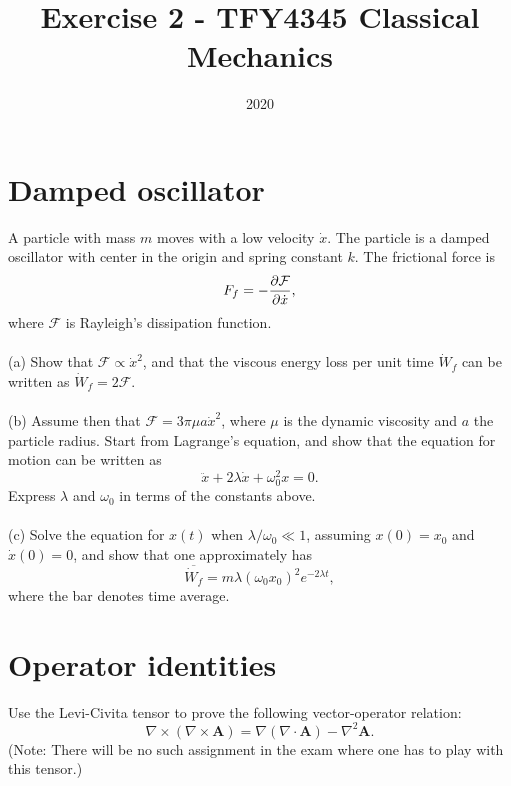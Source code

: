 \documentclass{article}
\title{Exercise 2 - TFY4345 Classical Mechanics}
\date{2020}
\begin{document}
    \maketitle
    \section{Damped oscillator}
        A particle with mass $m$ moves with a low velocity $\dot x$. The particle is a damped oscillator with center in the origin and spring constant $k$. The frictional force is 
        \begin{equation*}
            F_f = - \pdv{\mathcal{F}}{\dot x},
        \end{equation*}
        where $\mathcal{F}$ is Rayleigh's dissipation function. \\ \\
        (a) Show that $\mathcal{F} \propto \dot x^2$, and that the viscous energy loss per unit time $\dot W_f$ can be written as $\dot W_f = 2 \mathcal{F}$. \\ \\
        (b) Assume then that $\mathcal{F} = 3 \pi \mu a \dot x^2$, where $\mu$ is the dynamic viscosity and $a$ the particle radius. Start from Lagrange's equation, and show that the equation for motion can be written as 
        \begin{equation*}
            \ddot x + 2 \lambda \dot x + \omega^2_0 x = 0.
        \end{equation*}
        Express $\lambda$ and $\omega_0$ in terms of the constants above. \\ \\
        (c) Solve the equation for $x(t)$ when $\lambda / \omega_0 \ll 1$, assuming $x(0) = x_0$ and $\dot x(0) = 0$, and show that one approximately has 
        \begin{equation*}
            \overline{\dot W_f} = m \lambda \left(\omega_0 x_0\right)^2 e^{-2 \lambda t},
        \end{equation*}
        where the bar denotes time average.
        

    \section{Operator identities}
        Use the Levi-Civita tensor to prove the following vector-operator relation:
        \begin{equation*}
            \nabla \times \left( \nabla \times \mathbf{A} \right) = \nabla \left(\nabla \cdot \mathbf{A}\right) - \nabla^2 \mathbf{A}.
        \end{equation*}
        (Note: There will be no such assignment in the exam where one has to play with this tensor.)
\end{document}
